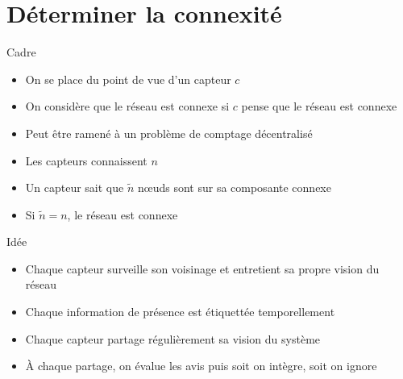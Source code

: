 \documentclass{beamer}
\begin{document}
\section{Déterminer la connexité}

\begin{frame}

  \begin{block}{Cadre}
    \begin{itemize}
      \item{On se place du point de vue d'un capteur $c$}
      \item{On considère que le réseau est connexe si $c$ pense que le réseau
        est connexe}
    \end{itemize}
  \end{block}

  \vfill

  \begin{block}{}
    \begin{itemize}
      \item{Peut être ramené à un problème de comptage décentralisé}
      \item{Les capteurs connaissent $n$}
      \item{Un capteur sait que $\tilde{n}$ n\oe uds sont sur sa
        composante connexe}
      \item{Si $\tilde{n} = n$, le réseau est connexe}
    \end{itemize}
  \end{block}

\end{frame}


\begin{frame}

  \begin{block}{Idée}
    \begin{itemize}
    \item{Chaque capteur surveille son voisinage et entretient sa
      propre vision du réseau}
    \item{Chaque information de présence est étiquettée
      temporellement}
    \item{Chaque capteur partage régulièrement sa vision du système}
    \item{\`A chaque partage, on évalue les avis puis soit on intègre,
      soit on ignore}
    \end{itemize}
  \end{block}

\end{frame}
\end{document}
